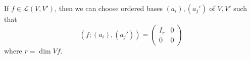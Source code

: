 If $f \in \mathcal{L}(V, V')$, then we can choose ordered bases $(a_i), (a_j')$ of $V, V'$ such that
$$
(f; (a_i), (a_j')) = \begin{pmatrix} I_r & 0 \\ 0 & 0 \end{pmatrix}
$$
where $r = \dim Vf$.

